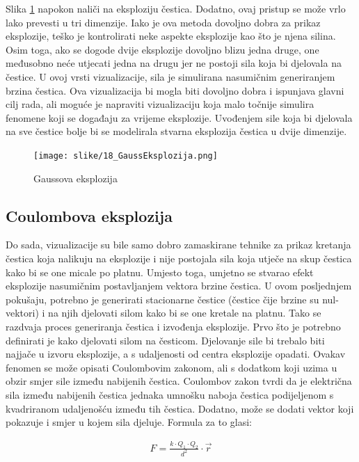 \documentclass{foi}
\begin{document}
Slika \ref{fig:GaussEksplozija} napokon naliči na eksploziju čestica. Dodatno, ovaj pristup se može vrlo lako prevesti u tri dimenzije. Iako je ova metoda dovoljno dobra za prikaz eksplozije, teško je kontrolirati neke aspekte eksplozije kao što je njena silina. Osim toga, ako se dogode dvije eksplozije dovoljno blizu jedna druge, one međusobno neće utjecati jedna na drugu jer ne postoji sila koja bi djelovala na čestice. U ovoj vrsti vizualizacije, sila je simulirana nasumičnim generiranjem brzina čestica. Ova vizualizacija bi mogla biti dovoljno dobra i ispunjava glavni cilj rada, ali moguće je napraviti vizualizaciju koja malo točnije simulira fenomene koji se događaju za vrijeme eksplozije. Uvođenjem sile koja bi djelovala na sve čestice bolje bi se modelirala stvarna eksplozija čestica u dvije dimenzije.

\begin{figure}[H]
    \centering
    \texttt{[image: slike/18\_GaussEksplozija.png]}
    \captionsetup{justification=centering}
    \caption{Gaussova eksplozija}
\label{fig:GaussEksplozija}
\end{figure}


\subsection{Coulombova eksplozija}
Do sada, vizualizacije su bile samo dobro zamaskirane tehnike za prikaz kretanja čestica koja nalikuju na eksplozije i nije postojala sila koja utječe na skup čestica kako bi se one micale po platnu. Umjesto toga, umjetno se stvarao efekt eksplozije nasumičnim postavljanjem vektora brzine čestica. U ovom posljednjem pokušaju, potrebno je generirati stacionarne čestice (čestice čije brzine su nul-vektori) i na njih djelovati silom kako bi se one kretale na platnu. Tako se razdvaja proces generiranja čestica i izvođenja eksplozije. Prvo što je potrebno definirati je kako djelovati silom na česticom. Djelovanje sile bi trebalo biti najjače u izvoru eksplozije, a s udaljenosti od centra eksplozije opadati. Ovakav fenomen se može opisati Coulombovim zakonom, ali s dodatkom koji uzima u obzir smjer sile između nabijenih čestica. Coulombov zakon tvrdi da je električna sila između nabijenih čestica jednaka umnošku naboja čestica podijeljenom s kvadriranom udaljenošću između tih čestica. Dodatno, može se dodati vektor koji pokazuje i smjer u kojem sila djeluje. Formula za to glasi:

 \begin{align*}
F = \frac{k\cdot Q_1\cdot Q_2}{d^2}\cdot \Vec{r}
\end{align*}
\end{document}
